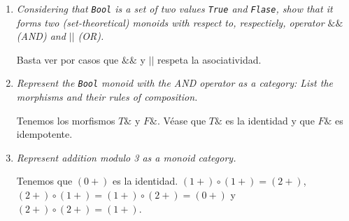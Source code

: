 \documentclass[11pt]{article}
\begin{document}
\begin{enumerate}
\item \textit{Considering that \texttt{Bool} is a set of two values \texttt{True} and \texttt{Flase}, show that it forms two (set-theoretical) monoids with respect to, respectiely, operator $\&\&$ (AND) and $||$ (OR).}

Basta ver por casos que $\&\&$ y $||$ respeta la asociatividad.

\item \textit{Represent the \texttt{Bool} monoid with the AND operator as a category: List the morphisms and their rules of composition.}


Tenemos los morfismos $T\&$ y $F\&$. Véase que $T\&$ es la identidad y que $F\&$ es idempotente.

\item \textit{Represent addition modulo 3 as a monoid category.}


Tenemos que $(0+)$ es la identidad. $(1+) \circ (1+) = (2+)$, $(2+) \circ (1+) = (1+) \circ (2+) = (0+)$ y $(2+) \circ (2+) = (1+)$.
\end{enumerate}
\end{document}
